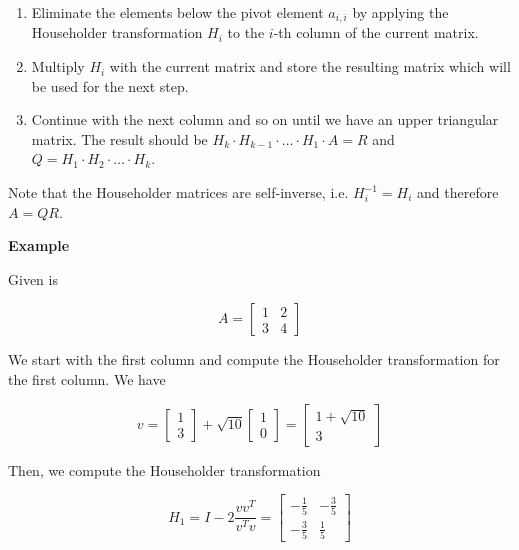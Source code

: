 \begin{enumerate}

    \item Eliminate the elements below the pivot element \(a_{i,i}\) by applying the Householder transformation \(H_i\) to the \(i\)-th column of the current matrix.

    \item Multiply \(H_i\) with the current matrix and store the resulting matrix which will be used for the next step.

    \item Continue with the next column and so on until we have an upper triangular matrix. The result should be \(H_k \cdot H_{k - 1} \cdot \dots \cdot H_1 \cdot A = R\) and \(Q = H_1 \cdot H_2 \cdot \dots \cdot H_k\).
 
\end{enumerate}

Note that the Householder matrices are self-inverse, i.e. \(H_i^{-1} = H_i\) and therefore \(A = Q R\).

\textbf{Example}

Given is  

\[
    A = 
    \begin{bmatrix}
        1 & 2 \\ 
        3 & 4
    \end{bmatrix}
\]

We start with the first column and compute the Householder transformation for the first column. We have

\[
    v = 
    \begin{bmatrix}
        1 \\ 
        3
    \end{bmatrix}
    + \sqrt{10} 
    \begin{bmatrix}
        1 \\ 
        0
    \end{bmatrix}
    =
    \begin{bmatrix}
        1 + \sqrt{10} \\ 
        3
    \end{bmatrix}
\]

Then, we compute the Householder transformation

\[
    H_1 = I - 2 \frac{vv^T}{v^Tv} = 
    \begin{bmatrix}
        -\frac{1}{5} & -\frac{3}{5} \\ 
        -\frac{3}{5} & \frac{1}{5}
    \end{bmatrix}
\]

